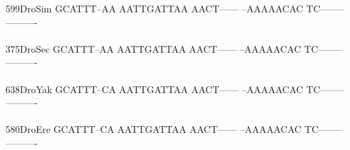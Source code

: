 \documentclass[11pt,twoside,reqno,a4paper]{article}
\begin{document}
{599\hspace*{2\charwidth}DroSim	GCATTT--AA	AATTGATTAA	AACT------	--AAAAACAC	TC--------	----------	\\
\hspace*{5\charwidth}\hspace*{7\charwidth}\hspace*{1\charwidth}\hspace*{1\charwidth}\hspace*{1\charwidth}\hspace*{1\charwidth}\hspace*{1\charwidth}\hspace*{1\charwidth}\\
375\hspace*{2\charwidth}DroSec	GCATTT--AA	AATTGATTAA	AACT------	--AAAAACAC	TC--------	----------	\\
\hspace*{5\charwidth}\hspace*{7\charwidth}\hspace*{1\charwidth}\hspace*{1\charwidth}\hspace*{1\charwidth}\hspace*{1\charwidth}\hspace*{1\charwidth}\hspace*{1\charwidth}\\
638\hspace*{2\charwidth}DroYak	GCATTT--CA	AATTGATTAA	AACT------	--AAAAACAC	TC--------	----------	\\
\hspace*{5\charwidth}\hspace*{7\charwidth}\hspace*{1\charwidth}\hspace*{1\charwidth}\hspace*{1\charwidth}\hspace*{1\charwidth}\hspace*{1\charwidth}\hspace*{1\charwidth}\\
580\hspace*{2\charwidth}DroEre	GCATTT--CA	AATTGATTAA	AACT------	--AAAAACAC	TC--------	----------	\\
\hspace*{5\charwidth}\hspace*{7\charwidth}\hspace*{1\charwidth}\hspace*{1\charwidth}\hspace*{1\charwidth}\hspace*{1\charwidth}\hspace*{1\charwidth}\hspace*{1\charwidth}\\
}
\end{document}
